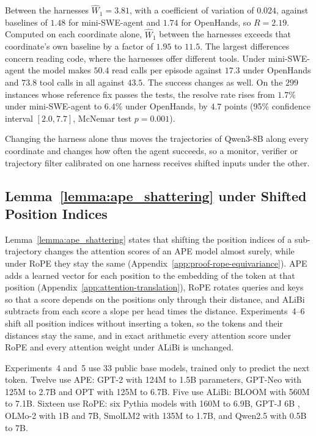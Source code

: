 Between the harnesses $\widehat W_1=3.81$, with a coefficient of variation of $0.024$, against baselines of $1.48$ for mini-SWE-agent and $1.74$ for OpenHands, so $R=2.19$. Computed on each coordinate alone, $\widehat W_1$ between the harnesses exceeds that coordinate's own baseline by a factor of $1.95$ to $11.5$. The largest differences concern reading code, where the harnesses offer different tools. Under mini-SWE-agent the model makes $50.4$ read calls per episode against $17.3$ under OpenHands and $73.8$ tool calls in all against $43.5$. The success changes as well. On the $299$ instances whose reference fix passes the tests, the resolve rate rises from $1.7\%$ under mini-SWE-agent to $6.4\%$ under OpenHands, by $4.7$ points (95\% confidence interval $[2.0,7.7]$, McNemar test $p=0.001$).

Changing the harness alone thus moves the trajectories of Qwen3-8B along every coordinate and changes how often the agent succeeds, so a monitor, verifier or trajectory filter calibrated on one harness receives shifted inputs under the other.

\subsection{Lemma~\ref{lemma:ape_shattering} under Shifted Position Indices}
\label{app:c1}

Lemma~\ref{lemma:ape_shattering} states that shifting the position indices of a sub-trajectory changes the attention scores of an APE model almost surely, while under RoPE they stay the same (Appendix~\ref{app:proof-rope-equivariance}). APE adds a learned vector for each position to the embedding of the token at that position (Appendix~\ref{app:attention-translation}), RoPE \citep{su2023roformerenhancedtransformerrotary} rotates queries and keys so that a score depends on the positions only through their distance, and ALiBi \citep{press2022trainshorttestlong} subtracts from each score a slope per head times the distance. Experiments~4--6 shift all position indices without inserting a token, so the tokens and their distances stay the same, and in exact arithmetic every attention score under RoPE and every attention weight under ALiBi is unchanged.

Experiments~4 and~5 use $33$ public base models, trained only to predict the next token. Twelve use APE: GPT-2 \citep{radford2019language} with 124M to 1.5B parameters, GPT-Neo \citep{black2021gptneo} with 125M to 2.7B and OPT \citep{zhang2022opt} with 125M to 6.7B. Five use ALiBi: BLOOM \citep{bigscience2022bloom} with 560M to 7.1B. Sixteen use RoPE: six Pythia models \citep{biderman2023pythia} with 160M to 6.9B, GPT-J 6B \citep{wang2021gptj}, OLMo-2 \citep{olmo2024olmo2} with 1B and 7B, SmolLM2 \citep{allal2025smollm2} with 135M to 1.7B, and Qwen2.5 \citep{qwen2024qwen25} with 0.5B to 7B.


